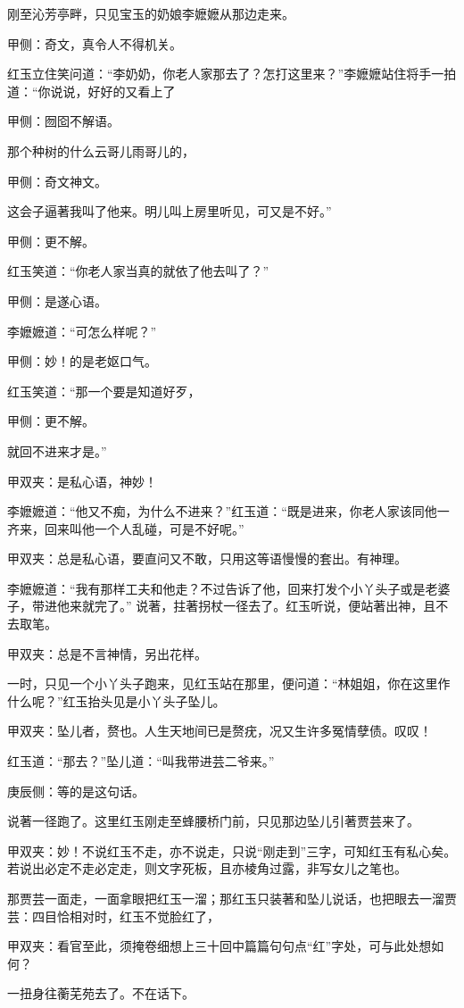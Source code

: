 \begin{parag}
    刚至沁芳亭畔，只见宝玉的奶娘李嬷嬷从那边走来。\begin{note}甲侧：奇文，真令人不得机关。\end{note}红玉立住笑问道：“李奶奶，你老人家那去了？怎打这里来？”李嬷嬷站住将手一拍道：“你说说，好好的又看上了\begin{note}甲侧：囫囵不解语。\end{note}那个种树的什么云哥儿雨哥儿的，\begin{note}甲侧：奇文神文。\end{note}这会子逼著我叫了他来。明儿叫上房里听见，可又是不好。”\begin{note}甲侧：更不解。\end{note}红玉笑道：“你老人家当真的就依了他去叫了？”\begin{note}甲侧：是遂心语。\end{note}李嬷嬷道：“可怎么样呢？”\begin{note}甲侧：妙！的是老妪口气。\end{note}红玉笑道：“那一个要是知道好歹，\begin{note}甲侧：更不解。\end{note}就回不进来才是。”\begin{note}甲双夹：是私心语，神妙！\end{note}李嬷嬷道：“他又不痴，为什么不进来？”红玉道：“既是进来，你老人家该同他一齐来，回来叫他一个人乱碰，可是不好呢。”\begin{note}甲双夹：总是私心语，要直问又不敢，只用这等语慢慢的套出。有神理。\end{note}李嬷嬷道：“我有那样工夫和他走？不过告诉了他，回来打发个小丫头子或是老婆子，带进他来就完了。” 说著，拄著拐杖一径去了。红玉听说，便站著出神，且不去取笔。\begin{note}甲双夹：总是不言神情，另出花样。\end{note}
\end{parag}


\begin{parag}
    一时，只见一个小丫头子跑来，见红玉站在那里，便问道：“林姐姐，你在这里作什么呢？”红玉抬头见是小丫头子坠儿。\begin{note}甲双夹：坠儿者，赘也。人生天地间已是赘疣，况又生许多冤情孽债。叹叹！\end{note}红玉道：“那去？”坠儿道：“叫我带进芸二爷来。”\begin{note}庚辰侧：等的是这句话。\end{note}说著一径跑了。这里红玉刚走至蜂腰桥门前，只见那边坠儿引著贾芸来了。\begin{note}甲双夹：妙！不说红玉不走，亦不说走，只说“刚走到”三字，可知红玉有私心矣。若说出必定不走必定走，则文字死板，且亦棱角过露，非写女儿之笔也。\end{note}那贾芸一面走，一面拿眼把红玉一溜；那红玉只装著和坠儿说话，也把眼去一溜贾芸：四目恰相对时，红玉不觉脸红了，\begin{note}甲双夹：看官至此，须掩卷细想上三十回中篇篇句句点“红”字处，可与此处想如何？\end{note}一扭身往蘅芜苑去了。不在话下。
\end{parag}


